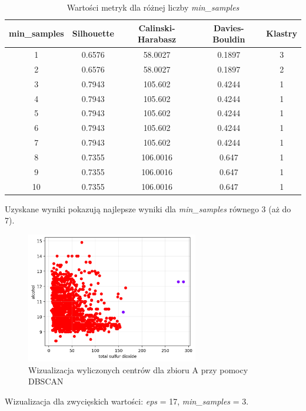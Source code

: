 \documentclass[a4paper,11pt]{article}
\begin{document}
\begin{table}[H]
\centering
\begin{tabular}{|c|c|c|c|c|}
\hline
\textbf{min\_samples} & \textbf{Silhouette} & \textbf{Calinski-Harabasz} & \textbf{Davies-Bouldin} & \textbf{Klastry} \\ \hline
1 & 0.6576 & 58.0027 & 0.1897 & 3 \\ \hline
2 & 0.6576 & 58.0027 & 0.1897 & 2 \\ \hline
3 & 0.7943 & 105.602 & 0.4244 & 1 \\ \hline
4 & 0.7943 & 105.602 & 0.4244 & 1 \\ \hline
5 & 0.7943 & 105.602 & 0.4244 & 1 \\ \hline
6 & 0.7943 & 105.602 & 0.4244 & 1 \\ \hline
7 & 0.7943 & 105.602 & 0.4244 & 1 \\ \hline
8 & 0.7355 & 106.0016 & 0.647 & 1 \\ \hline
9 & 0.7355 & 106.0016 & 0.647 & 1 \\ \hline
10 & 0.7355 & 106.0016 & 0.647 & 1 \\ \hline
\end{tabular}
\caption{Wartości metryk dla różnej liczby \textit{min\_samples}}
\label{tab:dbscan2}
\end{table}

Uzyskane wyniki pokazują najlepsze wyniki dla \textit{min\_samples} równego 3 (aż do 7).

\begin{figure}[H]
    \centering
    \includegraphics[width=0.67\textwidth]{images2/dbscan/d2.png}
    \caption{Wizualizacja wyliczonych centrów dla zbioru A przy pomocy DBSCAN}
    \label{fig:em_a_22}
\end{figure}

Wizualizacja dla zwycięskich wartości: \textit{eps} = 17, \textit{min\_samples} = 3.
\end{document}
